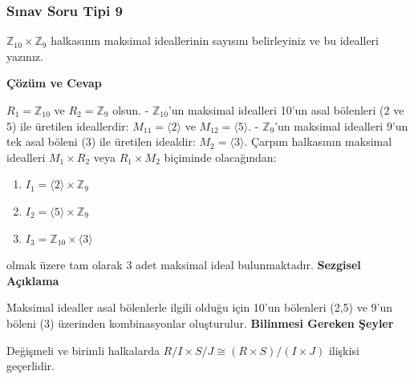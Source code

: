 \documentclass[11pt, a4paper]{article}
\newenvironment{cozum}{
    \vspace{0.5cm}
    \noindent\textcolor{green!60!black}{\faCheckCircle\enspace \textbf{\Large Çözüm ve Cevap}}\par\vspace{0.2cm}
}{}
\newenvironment{sezgisel}{
    \vspace{0.5cm}
    \noindent\textcolor{orange!80!black}{\faLightbulb\enspace \textbf{\Large Sezgisel Açıklama}}\par\vspace{0.2cm}
    \itshape
}{}
\newenvironment{bilgi}{
    \vspace{0.5cm}
    \noindent\textcolor{red!70!black}{\faExclamationTriangle\enspace \textbf{\Large Bilinmesi Gereken Şeyler}}\par\vspace{0.2cm}
}{}
\begin{document}
\subsubsection{Sınav Soru Tipi 9}
\begin{sinavbox}
$\mathbb{Z}_{10} \times \mathbb{Z}_{9}$ halkasının maksimal ideallerinin sayısını belirleyiniz ve bu idealleri yazınız.
\end{sinavbox}
\begin{cozum}
$R_1 = \mathbb{Z}_{10}$ ve $R_2 = \mathbb{Z}_9$ olsun.
- $\mathbb{Z}_{10}$'un maksimal idealleri 10'un asal bölenleri ($2$ ve $5$) ile üretilen ideallerdir:
  $M_{11} = \langle 2 \rangle$ ve $M_{12} = \langle 5 \rangle$.
- $\mathbb{Z}_9$'un maksimal idealleri 9'un tek asal böleni ($3$) ile üretilen idealdir:
  $M_{2} = \langle 3 \rangle$.
Çarpım halkasının maksimal idealleri $M_1 \times R_2$ veya $R_1 \times M_2$ biçiminde olacağından:
\begin{enumerate}
    \item $I_1 = \langle 2 \rangle \times \mathbb{Z}_9$
    \item $I_2 = \langle 5 \rangle \times \mathbb{Z}_9$
    \item $I_3 = \mathbb{Z}_{10} \times \langle 3 \rangle$
\end{enumerate}
olmak üzere tam olarak 3 adet maksimal ideal bulunmaktadır.
\end{cozum}
\begin{sezgisel}
Maksimal idealler asal bölenlerle ilgili olduğu için 10'un bölenleri (2,5) ve 9'un böleni (3) üzerinden kombinasyonlar oluşturulur.
\end{sezgisel}
\begin{bilgi}
Değişmeli ve birimli halkalarda $R/I \times S/J \cong (R \times S)/(I \times J)$ ilişkisi geçerlidir.
\end{bilgi}

\newpage
\end{document}
